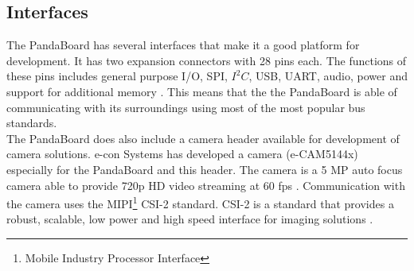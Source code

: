\subsection{Interfaces}
The PandaBoard has several interfaces that make it a good platform for development. It has two expansion connectors with 28 pins each. The functions of these pins includes general purpose I/O, SPI, $I^2C$, USB, UART, audio, power and support for additional memory \citep{pandaManual}. This means that the the PandaBoard is able of communicating with its surroundings using most of the most popular bus standards.\\
\newline
The PandaBoard does also include a camera header available for development of camera solutions. e-con Systems has developed a camera (e-CAM51\textunderscore 44x) especially for the PandaBoard and this header. The camera is a 5 MP auto focus camera able to provide 720p HD video streaming at 60 fps \citep{camera}. Communication with the camera uses the MIPI\footnote{Mobile Industry Processor Interface} CSI-2 standard. CSI-2 is a standard that provides a robust, scalable, low power and high speed interface for imaging solutions \citep{img}.  
